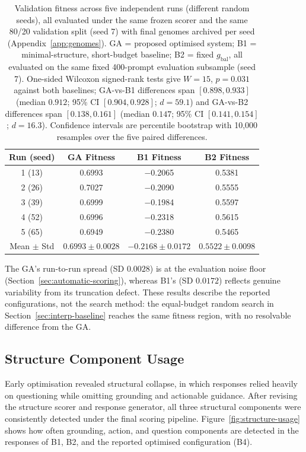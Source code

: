 \documentclass[mathematics,article,submit,xetex,moreauthors]{Definitions/mdpi}
\begin{document}
\begin{table}[H]
\centering
\small
\caption{Validation fitness across five independent runs (different random
seeds), all evaluated under the same frozen scorer and the same 80/20
validation split (seed 7) with final genomes archived per
seed (Appendix~\ref{app:genomes}). GA = proposed optimised system;
B1 = minimal-structure, short-budget baseline;
B2 = fixed $g_\mathrm{bal}$, all evaluated on the same fixed 400-prompt
evaluation subsample (seed 7).
One-sided Wilcoxon signed-rank tests give $W=15$, $p=0.031$ against both
baselines; GA-vs-B1 differences span $[0.898, 0.933]$ (median $0.912$;
95\% CI $[0.904, 0.928]$; $d=59.1$) and GA-vs-B2 differences span
$[0.138, 0.161]$ (median $0.147$; 95\% CI $[0.141, 0.154]$; $d=16.3$). Confidence intervals are percentile bootstrap with 10{,}000 resamples over
the five paired differences.}
\label{tab:significance}
\begin{tabular}{cccc}
\toprule
\textbf{Run (seed)} & \textbf{GA Fitness} & \textbf{B1 Fitness} & \textbf{B2 Fitness} \\
\midrule
1 (13) & 0.6993 & $-$0.2065 & 0.5381 \\
2 (26) & 0.7027 & $-$0.2090 & 0.5555 \\
3 (39) & 0.6999 & $-$0.1984 & 0.5597 \\
4 (52) & 0.6996 & $-$0.2318 & 0.5615 \\
5 (65) & 0.6949 & $-$0.2380 & 0.5465 \\
\midrule
Mean $\pm$ Std & $0.6993 \pm 0.0028$ & $-0.2168 \pm 0.0172$ & $0.5522 \pm 0.0098$ \\
\bottomrule
\end{tabular}
\end{table}

The GA's run-to-run spread (SD $0.0028$) is at the evaluation noise floor
(Section~\ref{sec:automatic-scoring}), whereas B1's (SD $0.0172$) reflects
genuine variability from its truncation defect. These results describe the reported configurations, not the search method:
the equal-budget random search in Section~\ref{sec:interp-baseline} reaches
the same fitness region, with no resolvable difference from the GA.

\subsection{Structure Component Usage}
\label{sec:structure-analysis}

Early optimisation revealed structural collapse, in which responses relied
heavily on questioning while omitting grounding and actionable guidance. After
revising the structure scorer and response generator, all three structural
components were consistently detected under the final scoring pipeline.
Figure~\ref{fig:structure-usage} shows how often grounding, action, and
question components are detected in the responses of B1, B2, and the reported
optimised configuration (B4).
\end{document}
